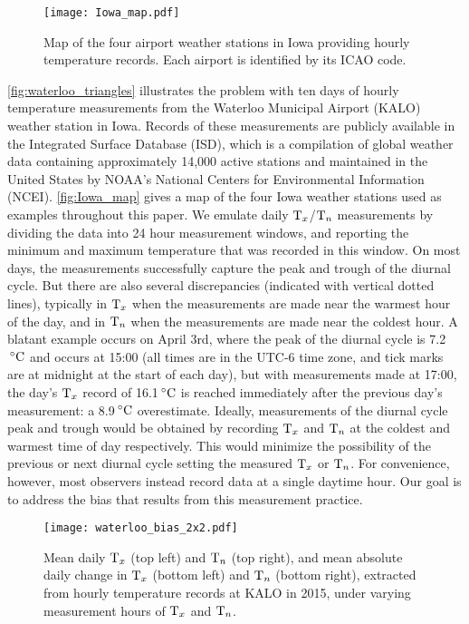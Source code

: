 \begin{figure}[tbp]
\centering
\texttt{[image: Iowa\_map.pdf]}
\caption{
\label{fig:Iowa_map}
Map of the four airport weather stations in Iowa providing hourly temperature records. 
Each airport is identified by its ICAO code.
}
\end{figure}

\autoref{fig:waterloo_triangles} illustrates the problem with ten days of hourly temperature measurements from the Waterloo Municipal Airport (KALO) weather station in Iowa. 
Records of these measurements are publicly available in the Integrated Surface Database (ISD), which is a compilation of global weather data containing approximately 14,000 active stations and maintained in the United States by NOAA's National Centers for Environmental Information (NCEI).
\autoref{fig:Iowa_map} gives a map of the four Iowa weather stations used as examples throughout this paper.
We emulate daily \(\mathrm{T}_{x}\)/\(\mathrm{T}_{n}\) measurements by dividing the data into 24 hour measurement windows, and reporting the minimum and maximum temperature that was recorded in this window.
On most days, the measurements successfully capture the peak and trough of the diurnal cycle.
But there are also several discrepancies (indicated with vertical dotted lines), typically in \(\mathrm{T}_{x}\) when the measurements are made near the warmest hour of the day, and in \(\mathrm{T}_{n}\) when the measurements are made near the coldest hour.
A blatant example occurs on April 3rd,
where the peak of the diurnal cycle is 7.2\({\,^\circ}{}\mathrm{C}\) and occurs at 15:00 (all times are in the UTC-6 time zone, and tick marks are at midnight at the start of each day), but with measurements made at 17:00, the day's \(\mathrm{T}_{x}\) record of 16.1\({\,^\circ}{}\mathrm{C}\) is reached immediately after the previous day's measurement: a 8.9\({\,^\circ}{}\mathrm{C}\) overestimate.
Ideally, measurements of the diurnal cycle peak and trough would be obtained by recording \(\mathrm{T}_{x}\) and \(\mathrm{T}_{n}\) at the coldest and warmest time of day respectively.
This would minimize the possibility of the previous or next diurnal cycle setting the measured \(\mathrm{T}_{x}\) or \(\mathrm{T}_{n}\).
For convenience, however, most observers instead record data at a single daytime hour.
Our goal is to address the bias that results from this measurement practice.

\begin{figure}[tbp]
\centering
\texttt{[image: waterloo\_bias\_2x2.pdf]}
\caption{
\label{fig:waterloo_avgTnTx}
Mean daily \(\mathrm{T}_{x}\) (top left) and \(\mathrm{T}_{n}\) (top right), and
mean absolute daily change in \(\mathrm{T}_{x}\) (bottom left) and \(\mathrm{T}_{n}\) (bottom right),
extracted from hourly temperature records at KALO in 2015,
under varying measurement hours of \(\mathrm{T}_{x}\) and \(\mathrm{T}_{n}\).}
\end{figure}

